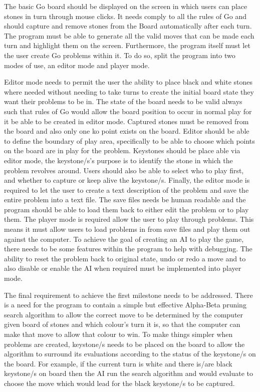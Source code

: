 \documentclass{l4proj}
\begin{document}
The basic Go board should be displayed on the screen in which users can place stones in turn through mouse clicks. It needs comply to all the rules of Go and should capture and remove stones from the Board automatically after each turn. The program must be able to generate all the valid moves that can be made each turn and highlight them on the screen. Furthermore, the program itself must let the user create Go problems within it. To do so, split the program into two modes of use, an editor mode and player mode.

Editor mode needs to permit the user the ability to place black and white stones where needed without needing to take turns to create the initial board state they want their problems to be in. The state of the board needs to be valid always such that rules of Go would allow the board position to occur in normal play for it be able to be created in editor mode. Captured stones must be removed from the board and also only one ko point exists on the board. Editor should be able to define the boundary of play area, specifically to be able to choose which points on the board are in play for the problem. Keystones should be place able via editor mode, the keystone/s’s purpose is to identify the stone in which the problem revolves around. Users should also be able to select who to play first, and whether to capture or keep alive the keystone/s. Finally, the editor mode is required to let the user to create a text description of the problem and save the entire problem into a text file. The save files needs be human readable and the program should be able to load them back to either edit the problem or to play them.
The player mode is required allow the user to play through problems. This means it must allow users to load problems in from save files and play them out against the computer. To achieve the goal of creating an AI to play the game, there needs to be some features within the program to help with debugging. The ability to reset the problem back to original state, undo or redo a move and to also disable or enable the AI when required must be implemented into player mode.

The final requirement to achieve the first milestone needs to be addressed. There is a need for the program to contain a simple but effective Alpha-Beta pruning search algorithm to allow the correct move to be determined by the computer given board of stones and which colour’s turn it is, so that the computer can make that move to allow that colour to win. To make things simpler when problems are created, keystone/s needs to be placed on the board to allow the algorithm to surround its evaluations according to the status of the keystone/s on the board. For example, if the current turn is white and there is/are black keystone/s on board then the AI run the search algorithm and would evaluate to choose the move which would lead for the black keystone/s to be captured.
\end{document}
